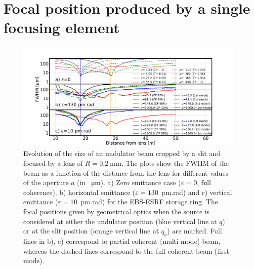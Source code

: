 \documentclass{osa-article}
\begin{document}
\section{Focal position produced by a single focusing element}
\label{sec:onelens}

\begin{figure}[t]
\hspace*{-1.0cm}
\centering
\includegraphics[width=1.1\textwidth]{evolution-eps-converted-to.pdf}
\caption{Evolution of the size of an undulator beam cropped by a slit and focused by a lens of $R=\SI{0.2}{\milli\meter}$.
The plots show the FWHM of the beam as a function of the distance from the lens for different values of the aperture $a$ (in \SI{}{\micro\meter}). 
a) Zero emittance case ($\varepsilon=0$, full coherence),
b) horizontal emittance ($\varepsilon=130$~pm.rad) and c) vertical emittance ($\varepsilon=10$~pm.rad) for the EBS-ESRF storage ring.
The focal positions given by geometrical optics when the source is considered at either the undulator position (blue vertical line at $q$) or at the slit position (orange vertical line at $q_a$) are marked.
Full lines in b), c) correspond to partial coherent (multi-mode) beam, whereas the dashed lines correspond to the full coherent beam (first mode).
}
\label{fig:oneTFund}
\end{figure}
\end{document}
